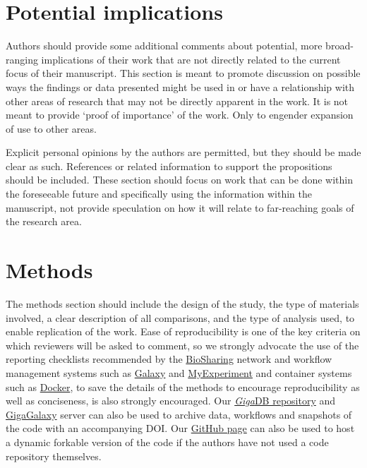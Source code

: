 \documentclass[a4paper,num-refs]{oup-contemporary}
\begin{document}
\section{Potential implications}

Authors should provide some additional comments about potential, more broad-ranging implications of their work that are not directly related to the current focus of their manuscript. This section is meant to promote discussion on possible ways the findings or data presented might be used in or have a relationship with other areas of research that may not be directly apparent in the work. It is not meant to provide `proof of importance' of the work. Only to engender expansion of use to other areas.

Explicit personal opinions by the authors are permitted, but they should be made clear as such. References or related information to support the propositions should be included. These section should focus on work that can be done within the foreseeable future and specifically using the information within the manuscript, not provide speculation on how it will relate to far-reaching goals of the research area.

\section{Methods}

The methods section should include the design of the study, the type of materials involved, a clear description of all comparisons, and the type of analysis used, to enable replication of the work. Ease of reproducibility is one of the key criteria on which reviewers will be asked to comment, so we strongly advocate the use of the reporting checklists recommended by the \href{https://biosharing.org/}{BioSharing} network and workflow management systems such as \href{https:/galaxyproject.org/}{Galaxy} and \href{http://www.myexperiment.org/home}{MyExperiment} and container systems such as \href{https://www.docker.com/}{Docker}, to save the details of the methods to encourage reproducibility as well as conciseness, is also strongly encouraged. Our \href{http://gigadb.org/}{\textit{Giga}DB repository}{} and \href{http://galaxy.cbiit.cuhk.edu.hk/}{GigaGalaxy} server can also be used to archive data, workflows and snapshots of the code with an accompanying DOI. Our \href{https://github.com/gigascience/papers}{GitHub page} can also be used to host a dynamic forkable version of the code if the authors have not used a code repository themselves.
\end{document}
